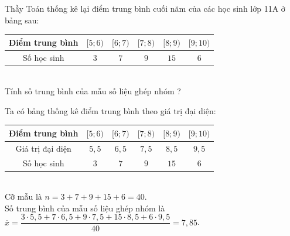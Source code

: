 \begin{ex}%
	Thầy Toán thống kê lại điểm trung bình cuối năm của các học sinh lớp 11A ở bảng sau:\\
	\begin{tabular}{|c|c|c|c|c| c|}
		\hline
		Điểm trung bình & $[5;6)$  & $[6;7)$  & $[7;8)$ & $[8;9)$  & $[9;10)$  \\
		\hline
		Số học sinh & $3$  & $7$ & $9$ & $15$ & $6$   \\
		\hline
	\end{tabular}\\
	Tính số trung bình của mẫu số liệu ghép nhóm ?
	\loigiai
	{
		Ta có bảng thống kê điểm trung bình theo giá trị đại diện:\\
		\begin{tabular}{|c|c|c|c|c| c|}
			\hline
			Điểm trung bình & $[5;6)$  & $[6;7)$  & $[7;8)$ & $[8;9)$  & $[9;10)$  \\
			\hline
			Giá trị đại diện & $5{,}5$  & $6{,}5$  & $7{,}5$  & $8{,}5$  & $9{,}5$     \\
			\hline
			Số học sinh & $3$  & $7$ & $9$ & $15$ & $6$   \\
			\hline
		\end{tabular}\\
		Cỡ mẫu là $n = 3 + 7 + 9 + 15 + 6 = 40$. \\
		Số trung bình của mẫu số liệu ghép nhóm là\\
		$\overline x  = \dfrac{{3\cdot 5{,}5 + 7\cdot 6{,}5 + 9\cdot 7{,}5 + 15\cdot 8{,}5 + 6\cdot 9{,}5}}{{40}} = 7{,}85$. 
		
	}
\end{ex}

